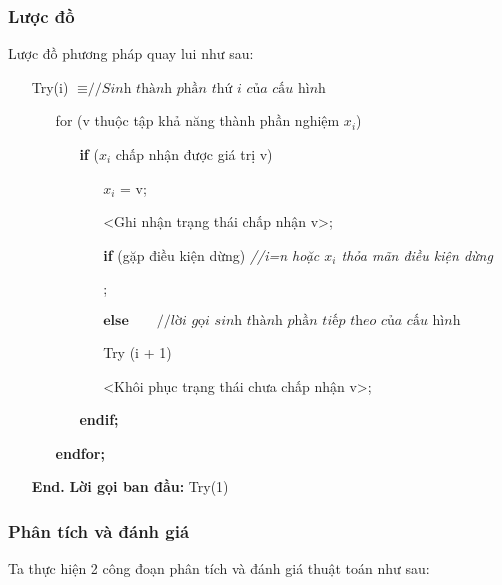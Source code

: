\subsubsection{Lược đồ}
Lược đồ phương pháp quay lui như sau:

\colorbox{mygrey}{\parbox{16cm}{
    \begin{itemize}
        \item [] Try(i) $\equiv \textit{//Sinh thành phần thứ i của cấu hình}$
            \begin{itemize}
                \item [] for (v thuộc tập khả năng thành phần nghiệm $x_i$)
                    \begin{itemize}
                        \item [] \textbf{if} ($x_i$ chấp nhận được giá trị v)
                            \begin{itemize}
                                \item [] $x_i$ = v;
                                \item [] <Ghi nhận trạng thái chấp nhận v>;
                                \item [] \textbf{if} (gặp điều kiện dừng) \textit{//i=n hoặc $x_i$ thỏa mãn điều kiện dừng}
                                \item [] ;
                                \item [] $\textbf{else} \qquad \textit{//lời gọi sinh thành phần tiếp theo của cấu hình}$
                                    \item [] \qquad Try (i + 1)
                                \item [] <Khôi phục trạng thái chưa chấp nhận v>;
                            \end{itemize}
                        \item [] \textbf{endif;}
                    \end{itemize}
                \item [] \quad \textbf{endfor;}
            \end{itemize}
        \item [] \qquad \textbf{End.} \hfill \textbf{Lời gọi ban đầu:} Try(1)
    \end{itemize}
    }
}

\subsubsection{Phân tích và đánh giá}
Ta thực hiện 2 công đoạn phân tích và đánh giá thuật toán như sau:


